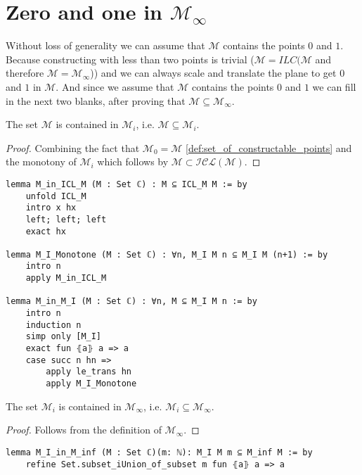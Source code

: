 \section{Zero and one in $\mathcal{M}_{\infty}$}
Without loss of generality we can assume that $\mathcal{M}$ contains the points $0$ and $1$.
Because constructing with less than two points is trivial ($\mathcal{M}=ILC(\mathcal{M}$ and therefore $\mathcal{M}=\mathcal{M}_{\infty}$)) and we can always scale and translate the plane to get $0$ and $1$ in $\mathcal{M}$.
And since we assume that $\mathcal{M}$ contains the points $0$ and $1$ we can fill in the next two blanks, 
after proving that $\mathcal{M} \subseteq \mathcal{M}_{\infty}$.

\begin{lemma}
    \label{lem:M_in_Mi}
    The set $\mathcal{M}$ is contained in $\mathcal{M}_i$, i.e. $\mathcal{M} \subseteq \mathcal{M}_i$.
\end{lemma}
\begin{proof}
    Combining the fact that $\mathcal{M}_0 = \mathcal{M}$ \ref{def:set_of_constructable_points} and the monotony of $\mathcal{M}_i$ which follows by $\mathcal{M} \subset \mathcal{ICL(M)}$.
\end{proof}

\begin{lstlisting}
lemma M_in_ICL_M (M : Set ℂ) : M ⊆ ICL_M M := by
    unfold ICL_M
    intro x hx 
    left; left; left
    exact hx

lemma M_I_Monotone (M : Set ℂ) : ∀n, M_I M n ⊆ M_I M (n+1) := by
    intro n
    apply M_in_ICL_M

lemma M_in_M_I (M : Set ℂ) : ∀n, M ⊆ M_I M n := by
    intro n
    induction n
    simp only [M_I]
    exact fun ⦃a⦄ a => a
    case succ n hn =>
        apply le_trans hn
        apply M_I_Monotone
\end{lstlisting}

\begin{lemma}
    The set $\mathcal{M}_i$ is contained in $\mathcal{M}_{\infty}$, i.e. $\mathcal{M}_i \subseteq \mathcal{M}_{\infty}$.
\end{lemma}

\begin{proof}
    Follows from the definition of $\mathcal{M}_{\infty}$.
\end{proof}

\begin{lstlisting}
lemma M_I_in_M_inf (M : Set ℂ)(m: ℕ): M_I M m ⊆ M_inf M := by
    refine Set.subset_iUnion_of_subset m fun ⦃a⦄ a => a
\end{lstlisting}

